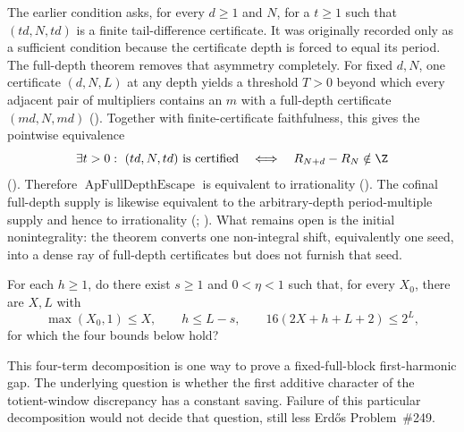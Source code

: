 The earlier condition
asks, for every $d\ge1$ and $N$, for a $t\ge1$ such that $(td,N,td)$ is a
finite tail-difference certificate.  It was originally recorded only as a
sufficient condition because the certificate depth is forced to equal its
period.  The full-depth theorem removes that asymmetry completely.
For fixed $d,N$, one certificate $(d,N,L)$ at any depth yields a threshold
$T>0$ beyond which every adjacent pair of multipliers contains an $m$ with a
full-depth certificate $(md,N,md)$
().
Together with finite-certificate faithfulness, this gives the pointwise
equivalence
\[
 \exists t>0:\ (td,N,td)\text{ is certified}
 \quad\Longleftrightarrow\quad R_{N+d}-R_N\notin\Z
\]
().
Therefore $\operatorname{ApFullDepthEscape}$ is equivalent to irrationality
().
The cofinal full-depth supply is likewise equivalent to the arbitrary-depth
period-multiple supply and hence to irrationality
(;
).
What remains open is the initial nonintegrality: the theorem converts one
non-integral shift, equivalently one seed, into a dense ray of full-depth
certificates but does not furnish that seed.

\begin{problem}
\label{prob:firstharmonic}
For each $h\ge1$, do there exist $s\ge1$ and $0<\eta<1$ such that, for every
$X_0$, there are $X,L$ with
\[
 \max(X_0,1)\le X,\qquad h\le L-s,\qquad
 16(2X+h+L+2)\le2^L,
\]
for which the four bounds below hold?
\end{problem}

\noindent This four-term decomposition is one way to prove a fixed-full-block
first-harmonic gap.  The underlying question is whether the first additive
character of the totient-window discrepancy has a constant saving.  Failure
of this particular decomposition would not decide that question, still less
Erd\H{o}s Problem~\#249.

